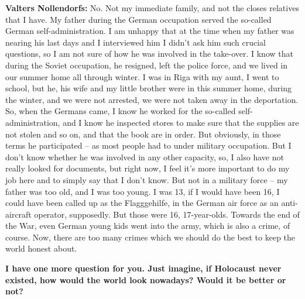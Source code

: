 \textbf{Valters Nollendorfs:} No. Not my immediate family, and not the closes relatives that I have. My father during the German occupation served the so-called German self-administration. I am unhappy that at the time when my father was nearing his last days and I interviewed him I didn’t ask him such crucial questions, so I am not sure of how he was involved in the take-over. I know that during the Soviet occupation, he resigned, left the police force, and we lived in our summer home all through winter. I was in Riga with my aunt, I went to school, but he, his wife and my little brother were in this summer home, during the winter, and we were not arrested, we were not taken away in the deportation. So, when the Germans came, I know he worked for the so-called self-administration, and I know he inspected stores to make sure that the supplies are not stolen and so on, and that the book are in order. But obviously, in those terms he participated – as most people had to under military occupation. But I don’t know whether he was involved in any other capacity, so, I also have not really looked for documents, but right now, I feel it’s more important to do my job here and to simply say that I don’t know. But not in a military force – my father was too old, and I was too young. I was 13, if I would have been 16, I could have been called up as the Flagggehilfe, in the German air force as an anti-aircraft operator, supposedly. But those were 16, 17-year-olds. Towards the end of the War, even German young kids went into the army, which is also a crime, of course. Now, there are too many crimes which we should do the best to keep the world honest about. 

\textbf{I have one more question for you. Just imagine, if Holocaust never existed, how would the world look nowadays? Would it be better or not?}


